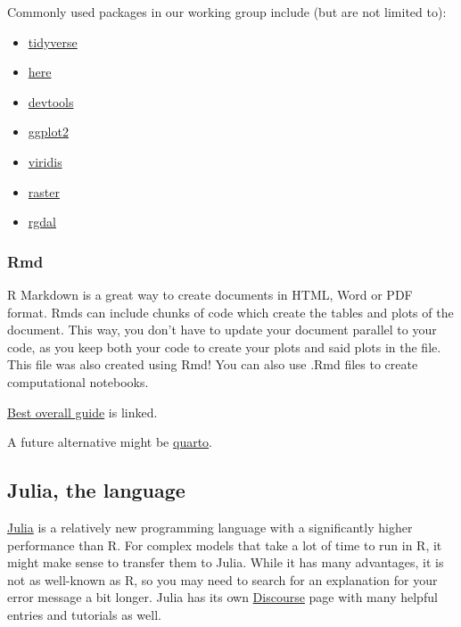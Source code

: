 \documentclass[
]{book}
\begin{document}
Commonly used packages in our working group include (but are not limited
to):

\begin{itemize}
\item
  \href{https://www.tidyverse.org/}{tidyverse}
\item
  \href{https://here.r-lib.org/}{here}
\item
  \href{https://www.r-project.org/nosvn/pandoc/devtools.html}{devtools}
\item
  \href{https://ggplot2.tidyverse.org/}{ggplot2}
\item
  \href{https://cran.r-project.org/web/packages/viridis/vignettes/intro-to-viridis.html}{viridis}
\item
  \href{https://cran.r-project.org/web/packages/raster/index.html}{raster}
\item
  \href{https://cran.r-project.org/web/packages/rgdal/index.html}{rgdal}
\end{itemize}

\subsubsection{Rmd}\label{rmd}

R Markdown is a great way to create documents in HTML, Word or PDF
format. Rmds can include chunks of code which create the tables and
plots of the document. This way, you don't have to update your document
parallel to your code, as you keep both your code to create your plots
and said plots in the file. This file was also created using Rmd! You
can also use .Rmd files to create computational notebooks.

\href{https://bookdown.org/yihui/rmarkdown/}{Best overall guide} is linked.

A future alternative might be \href{https://quarto.org/}{quarto}.

\subsection{Julia, the language}\label{julia-the-language}

\href{https://julialang.org/}{Julia} is a relatively new programming language
with a significantly higher performance than R. For complex models that
take a lot of time to run in R, it might make sense to transfer them to
Julia. While it has many advantages, it is not as well-known as R, so
you may need to search for an explanation for your error message a bit
longer. Julia has its own \href{https://discourse.julialang.org/}{Discourse}
page with many helpful entries and tutorials as well.
\end{document}
